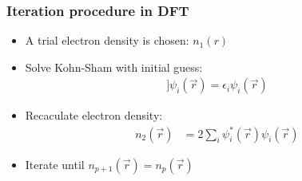 \documentclass[]{beamer}
\begin{document}


\begin{frame}
  \frametitle{Iteration procedure in DFT}   %
  \begin{itemize}
  \item A trial electron density is chosen: $n_1(r)$
  \item Solve Kohn-Sham with initial guess: 
\begin{align*} 
[\frac{\hbar^2}{2m}\nabla^2+V(\vec{r})+e^2\int\frac{n_1(\vec{r'})}{|\vec{r}-\vec{r'}|}d^3\vec{r'}+V_{XC}^{electron gas}[n_1(\vec{r})]]\psi_i(\vec{r})=\epsilon_i\psi_i(\vec{r})
\end{align*}
  \item Recaculate electron density:
 \begin{align*} 
	n_2(\vec{r})&=2\sum_i\psi_i^*(\vec{r})\psi_i(\vec{r})
	    \end{align*}
  \item Iterate until $n_{p+1}(\vec{r})=n_{p}(\vec{r})$	
  \end{itemize}
\end{frame}
\end{document}
